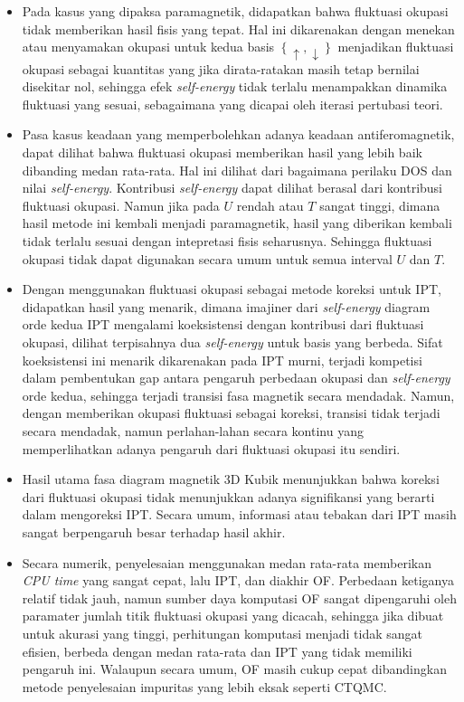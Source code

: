 \begin{itemize}
\item Pada kasus yang dipaksa paramagnetik, didapatkan bahwa fluktuasi okupasi tidak memberikan hasil fisis yang tepat. Hal ini dikarenakan dengan menekan atau menyamakan okupasi untuk kedua basis $\left\lbrace \uparrow, \downarrow\right\rbrace$ menjadikan fluktuasi okupasi sebagai kuantitas yang jika dirata-ratakan masih tetap bernilai disekitar nol, sehingga efek \textit{self-energy} tidak terlalu menampakkan dinamika fluktuasi yang sesuai, sebagaimana yang dicapai oleh iterasi pertubasi teori.

\item Pasa kasus keadaan yang memperbolehkan adanya keadaan antiferomagnetik, dapat dilihat bahwa fluktuasi okupasi memberikan hasil yang lebih baik dibanding medan rata-rata. Hal ini dilihat dari bagaimana perilaku DOS dan nilai \textit{self-energy}. Kontribusi \textit{self-energy} dapat dilihat berasal dari kontribusi fluktuasi okupasi. Namun jika pada $U$ rendah atau $T$ sangat tinggi, dimana hasil metode ini kembali menjadi paramagnetik, hasil yang diberikan kembali tidak terlalu sesuai dengan intepretasi fisis seharusnya. Sehingga fluktuasi okupasi tidak dapat digunakan secara umum untuk semua interval $U$ dan $T$.

\item Dengan menggunakan fluktuasi okupasi sebagai metode koreksi untuk IPT, didapatkan hasil yang menarik, dimana imajiner dari \textit{self-energy} diagram orde kedua IPT mengalami koeksistensi dengan kontribusi dari fluktuasi okupasi, dilihat terpisahnya dua \textit{self-energy} untuk basis yang berbeda. Sifat koeksistensi ini menarik dikarenakan pada IPT murni, terjadi kompetisi dalam pembentukan gap antara pengaruh perbedaan okupasi dan \textit{self-energy} orde kedua, sehingga terjadi transisi fasa magnetik secara mendadak. Namun, dengan memberikan okupasi fluktuasi sebagai koreksi, transisi tidak terjadi secara mendadak, namun perlahan-lahan secara kontinu yang memperlihatkan adanya pengaruh dari fluktuasi okupasi itu sendiri.

\item Hasil utama fasa diagram magnetik 3D Kubik menunjukkan bahwa koreksi dari fluktuasi okupasi tidak menunjukkan adanya signifikansi yang berarti dalam mengoreksi IPT. Secara umum, informasi atau tebakan dari IPT masih sangat berpengaruh besar terhadap hasil akhir.

\item Secara numerik, penyelesaian menggunakan medan rata-rata memberikan \textit{CPU time} yang sangat cepat, lalu IPT, dan diakhir OF. Perbedaan ketiganya relatif tidak jauh, namun sumber daya komputasi OF sangat dipengaruhi oleh paramater jumlah titik fluktuasi okupasi yang dicacah, sehingga jika dibuat untuk akurasi yang tinggi, perhitungan komputasi menjadi tidak sangat efisien, berbeda dengan medan rata-rata dan IPT yang tidak memiliki pengaruh ini. Walaupun secara umum, OF masih cukup cepat dibandingkan metode penyelesaian impuritas yang lebih eksak seperti CTQMC.

\end{itemize}


